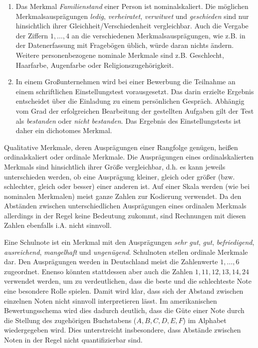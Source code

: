 \documentclass{lecture}
\begin{document}
    \begin{example}
        \begin{enumerate}
            \item Das Merkmal \emph{Familienstand} einer Person ist nominalskaliert.
            Die möglichen Merkmalsausprägungen \emph{ledig}, \emph{verheiratet}, \emph{verwitwet} und \emph{geschieden} sind nur hinsichtlich ihrer Gleichheit/Verschiedenheit vergleichbar.
            Auch die Vergabe der Ziffern \(1, \ldots, 4\) an die verschiedenen Merkmalsausprägungen, wie z.B. in der Datenerfassung mit Fragebögen üblich, würde daran nichts ändern.
            Weitere personenbezogene nominale Merkmale sind z.B. Geschlecht, Haarfarbe, Augenfarbe oder Religionszugehörigkeit.
            \item In einem Großunternehmen wird bei einer Bewerbung die Teilnahme an einem schriftlichen Einstellungstest vorausgesetzt.
            Das darin erzielte Ergebnis entscheidet über die Einladung zu einem persönlichen Gespräch.
            Abhängig vom Grad der erfolgreichen Bearbeitung der gestellten Aufgaben gilt der Test als \emph{bestanden} oder \emph{nicht bestanden}.
            Das Ergebnis des Einstellungstests ist daher ein dichotomes Merkmal.
        \end{enumerate}
    \end{example}

    Qualitative Merkmale, deren Ausprägungen einer Rangfolge genügen, heißen ordinalskaliert oder ordinale Merkmale.
    Die Ausprägungen eines ordinalskalierten Merkmals sind hinsichtlich ihrer Größe vergleichbar, d.h. es kann jeweils unterschieden werden, ob eine Ausprägung kleiner, gleich oder größer (bzw. schlechter, gleich oder besser) einer anderen ist.
    Auf einer Skala werden (wie bei nominalen Merkmalen) meist ganze Zahlen zur Kodierung verwendet.
    Da den Abständen zwischen unterschiedlichen Ausprägungen eines ordinalen Merkmals allerdings in der Regel keine Bedeutung zukommt, sind Rechnungen mit diesen Zahlen ebenfalls i.A. nicht sinnvoll.

    \begin{example}
        Eine Schulnote ist ein Merkmal mit den Ausprägungen \emph{sehr gut}, \emph{gut}, \emph{befriedigend}, \emph{ausreichend}, \emph{mangelhaft} und \emph{ungenügend}.
        Schulnoten stellen ordinale Merkmale dar.
        Den Ausprägungen werden in Deutschland meist die Zahlenwerte \(1, \ldots, 6\) zugeordnet.
        Enenso könnten stattdessen aber auch die Zahlen \(1, 11, 12, 13, 14, 24\) verwendet werden, um zu verdeutlichen, dass die beste und die schlechteste Note eine besondere Rolle spielen.
        Damit wird klar, dass sich der Abstand zwischen einzelnen Noten nicht sinnvoll interpretieren lässt.
        Im amerikanischen Bewertungsschema wird dies dadurch deutlich, dass die Güte einer Note durch die Stellung des zugehörigen Buchstabens (\(A, B, C, D, E, F\)) im Alphabet wiedergegeben wird.
        Dies unterstreicht insbesondere, dass Abstände zwischen Noten in der Regel nicht quantifizierbar sind.
    \end{example}
\end{document}
